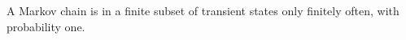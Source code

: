 A Markov chain is in a finite subset of transient states only finitely often, with probability one.
